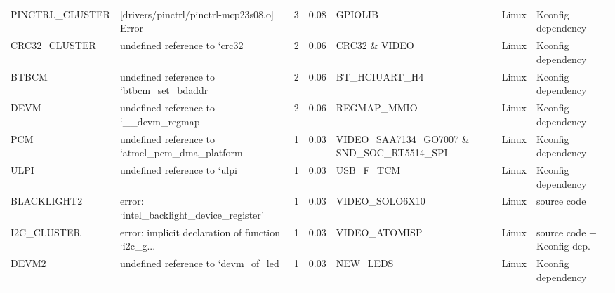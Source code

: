 \begin{tabular}{llrrlll}
    PINCTRL\_CLUSTER &         [drivers/pinctrl/pinctrl-mcp23s08.o] Error &            3 &        0.08 &                                           GPIOLIB  &   Linux &            Kconfig dependency \\
      CRC32\_CLUSTER &                      undefined reference to `crc32 &            2 &        0.06 &                                      CRC32 \& VIDEO &   Linux &            Kconfig dependency \\
              BTBCM &           undefined reference to `btbcm\_set\_bdaddr &            2 &        0.06 &                                      BT\_HCIUART\_H4 &   Linux &            Kconfig dependency \\
               DEVM &              undefined reference to `\_\_devm\_regmap &            2 &        0.06 &                                       REGMAP\_MMIO  &   Linux &            Kconfig dependency \\
                PCM &     undefined reference to `atmel\_pcm\_dma\_platform &            1 &        0.03 &         VIDEO\_SAA7134\_GO7007 \& SND\_SOC\_RT5514\_SPI  &   Linux &            Kconfig dependency \\
               ULPI &                       undefined reference to `ulpi &            1 &        0.03 &                                          USB\_F\_TCM &   Linux &            Kconfig dependency \\
        BLACKLIGHT2 &           error: ‘intel\_backlight\_device\_register’ &            1 &        0.03 &                                     VIDEO\_SOLO6X10 &   Linux &                   source code \\
        I2C\_CLUSTER &  error: implicit declaration of function ‘i2c\_g... &            1 &        0.03 &                                      VIDEO\_ATOMISP &   Linux &    source code + Kconfig dep. \\
              DEVM2 &                undefined reference to `devm\_of\_led &            1 &        0.03 &                                          NEW\_LEDS  &   Linux &            Kconfig dependency \\
\bottomrule
\end{tabular}

